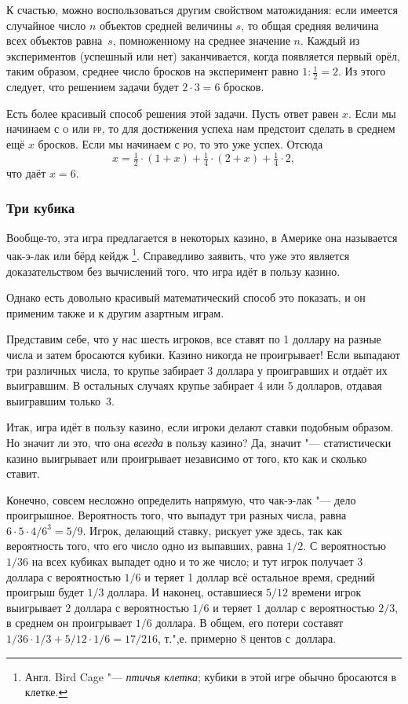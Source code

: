 \documentclass[twoside]{book}
\begin{document}
К счастью, можно воспользоваться другим свойством матожидания:
если имеется случайное число $n$ объектов средней величины $s$, то общая средняя величина всех объектов равна~$s$, помноженному на среднее значение $n$.
Каждый из экспериментов (успешный или нет) заканчивается, когда появляется первый орёл, таким образом, среднее число бросков на эксперимент равно $1:\tfrac12=2$.
Из этого следует, что
решением задачи будет $2\cdot 3=6$ бросков.\heart

Есть более красивый способ решения этой задачи.
Пусть ответ равен $x$.
Если мы начинаем с \textsc{о} или \textsc{рр}, то для достижения успеха нам предстоит сделать в среднем ещё $x$ бросков.
Если мы начинаем с \textsc{ро}, то это уже успех.
Отсюда 
\[x=\tfrac12 \cdot(1+x)+\tfrac14 \cdot(2+x)+\tfrac14 \cdot2,\]
что даёт $x=6$.

\subsubsection*{Три кубика}%

Вообще-то, эта игра предлагается в некоторых казино, в Америке она называется чак-э-лак или бёрд кейдж%
\footnote{Англ. Bird Cage "--- \emph{птичья клетка}; кубики в этой игре обычно бросаются в клетке.}. 
Справедливо заявить, что уже это является доказательством без вычислений того, что игра идёт в пользу казино.

Однако есть довольно красивый математический способ это показать, и он применим также и к другим азартным играм.

\medskip

Представим себе, что у нас шесть игроков, все ставят по 1 доллару на разные числа и затем бросаются кубики.
Казино никогда не проигрывает!
Если выпадают три различных числа, то крупье забирает 3 доллара у проигравших и отдаёт их выигравшим.
В остальных случаях крупье забирает 4 или 5 долларов, отдавая выигравшим только~3.
\heart

Итак, игра идёт в пользу казино, если игроки делают ставки подобным образом.
Но значит ли это, что она \emph{всегда} в пользу казино?
Да, значит "--- статистически казино выигрывает или проигрывает независимо от того, кто как и сколько ставит.

Конечно, совсем несложно определить напрямую, что чак-э-лак "--- дело проигрышное.
Вероятность того, что выпадут три разных числа, равна $6\cdot 5\cdot 4/6^3=5/9$.
Игрок, делающий ставку, рискует уже здесь, так как вероятность того, что его число одно из выпавших, равна $1/2$.
С вероятностью $1/36$ на всех кубиках выпадет одно и то же число;
и тут игрок получает $3$ доллара с вероятностью $1/6$ и теряет 1 доллар всё остальное время, средний проигрыш будет $1/3$ доллара.
И наконец, оставшиеся $5/12$ времени игрок выигрывает $2$ доллара с вероятностью $1/6$ и теряет $1$ доллар с вероятностью $2/3$, в среднем он проигрывает $1/6$ доллара.
В общем, его потери составят $1/36 \cdot 1/3 + 5/12 \cdot 1/6 = 17/216$, т.",е. примерно $8$ центов с~доллара.
\end{document}
